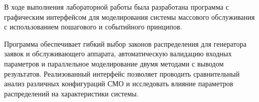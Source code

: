 В ходе выполнения лабораторной работы была разработана программа с графическим интерфейсом для моделирования системы массового обслуживания с использованием пошагового и событийного принципов.

Программа обеспечивает гибкий выбор законов распределения для генератора заявок и обслуживающего аппарата, автоматическую валидацию входных параметров и параллельное моделирование двумя методами с выводом результатов. Реализованный интерфейс позволяет проводить сравнительный анализ различных конфигураций СМО и исследовать влияние параметров распределений на характеристики системы.
